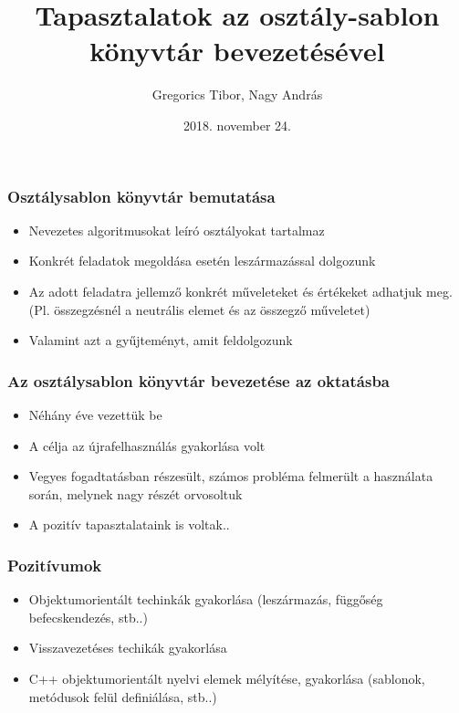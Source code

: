 \documentclass[11pt]{beamer}
\author{Gregorics Tibor, Nagy András}
\title{Tapasztalatok az osztály-sablon könyvtár bevezetésével}
\date{2018. november 24.}
\begin{document}
\begin{frame}
\titlepage
\end{frame}

\begin{frame}
	\frametitle{Osztálysablon könyvtár bemutatása}
	
	\begin{itemize}
		\item Nevezetes algoritmusokat leíró osztályokat tartalmaz
		\item Konkrét feladatok megoldása esetén leszármazással dolgozunk
		\item Az adott feladatra jellemző konkrét műveleteket és értékeket adhatjuk meg. (Pl. összegzésnél a neutrális elemet és az összegző műveletet)
		\item Valamint azt a gyűjteményt, amit feldolgozunk
	\end{itemize}
\end{frame}

\begin{frame}
	\frametitle{Az osztálysablon könyvtár bevezetése az oktatásba}
	\begin{itemize}
		\item Néhány éve vezettük be
		\vspace*{2px}
		\item A célja az újrafelhasználás gyakorlása volt
		\vspace*{2px}
		\item Vegyes fogadtatásban részesült, számos probléma felmerült a használata során, melynek nagy részét orvosoltuk
		\vspace*{2px}
		\item A pozitív tapasztalataink is voltak..
	\end{itemize}
\end{frame}

\begin{frame}
	\frametitle{Pozitívumok}
	\begin{itemize}

		\item Objektumorientált techinkák gyakorlása (leszármazás, függőség befecskendezés, stb..) 
		\vspace*{8px}
		\item Visszavezetéses techikák gyakorlása
		\vspace*{8px}
		\item C++ objektumorientált nyelvi elemek mélyítése, gyakorlása (sablonok, metódusok felül definiálása, stb..)
		
	\end{itemize}
\end{frame}
\end{document}
